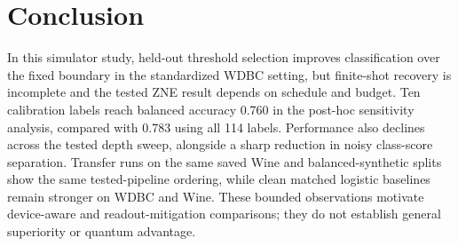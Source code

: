 \documentclass[conference]{IEEEtran}
\begin{document}
\section{Conclusion}
In this simulator study, held-out threshold selection improves classification over the fixed boundary in the standardized WDBC setting, but finite-shot recovery is incomplete and the tested ZNE result depends on schedule and budget. Ten calibration labels reach balanced accuracy 0.760 in the post-hoc sensitivity analysis, compared with 0.783 using all 114 labels. Performance also declines across the tested depth sweep, alongside a sharp reduction in noisy class-score separation. Transfer runs on the same saved Wine and balanced-synthetic splits show the same tested-pipeline ordering, while clean matched logistic baselines remain stronger on WDBC and Wine. These bounded observations motivate device-aware and readout-mitigation comparisons; they do not establish general superiority or quantum advantage.
\end{document}
